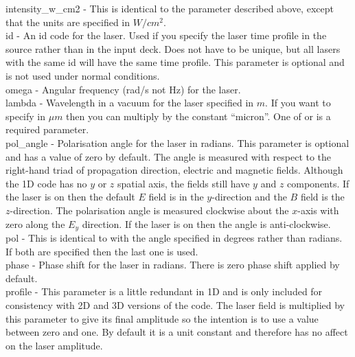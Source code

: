 {\emphtext intensity\_w\_cm2} - This is identical to the 
 parameter described above, except that the units
are specified in $W/cm^2$.\\

{\emphtext id} - An id code for the laser. Used if you specify the laser time
profile in the {\EPOCH} source rather than in the input deck. Does not have to
be unique, but all lasers with the same id will have the same time profile.
This parameter is optional and is not used under normal conditions.\\

{\emphtext omega} - Angular frequency (rad/s not Hz) for the laser.\\

{\emphtext lambda} - Wavelength in a vacuum for the laser specified in $m$.
If you want to specify in $\mu m$ then you can multiply by the constant
``micron''. One of  or  is a
required parameter.\\

{\emphtext pol\_angle} - Polarisation angle for the laser in radians.
This parameter is optional and has a value of zero by default.
The angle is measured with respect to the right-hand triad of propagation
direction, electric and magnetic fields. Although the 1D code has no $y$
or $z$ spatial axis, the fields still have $y$ and $z$ components.
If the laser is on  then the default $E$ field is in
the $y$-direction and the $B$ field is the $z$-direction. The polarisation
angle is measured clockwise about the $x$-axis with zero along the $E_y$
direction. If the laser is on  then the angle is
anti-clockwise.\\

{\emphtext pol} - This is identical to  with the angle
specified in degrees rather than radians. If both are specified then the
last one is used.\\

{\emphtext phase} - Phase shift for the laser in radians. 
There is zero phase shift applied by default.\\

{\emphtext profile} - This parameter is a little redundant in 1D and is
only included for consistency with 2D and 3D versions of the code.
The laser field is multiplied by this parameter to give its final amplitude
so the intention is to use a value between zero and one. By default it is a
unit constant and therefore has no affect on the laser amplitude.\\


